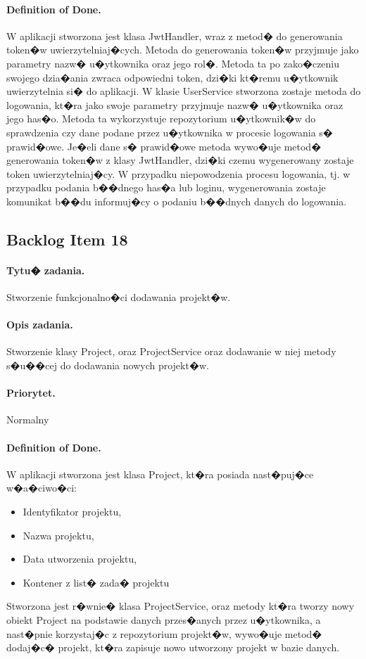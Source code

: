 ﻿\documentclass[a4paper]{article}
\begin{document}
\paragraph{Definition of Done.} W aplikacji stworzona jest klasa JwtHandler, wraz z metod� do generowania token�w uwierzytelniaj�cych. Metoda do generowania token�w przyjmuje jako parametry nazw� u�ytkownika oraz jego rol�. Metoda ta po zako�czeniu swojego dzia�ania zwraca odpowiedni token, dzi�ki kt�remu u�ytkownik uwierzytelnia si� do aplikacji. W klasie UserService stworzona zostaje metoda do logowania, kt�ra jako swoje parametry przyjmuje nazw� u�ytkownika oraz jego has�o. Metoda ta wykorzystuje repozytorium u�ytkownik�w do sprawdzenia czy dane podane przez u�ytkownika w procesie logowania s� prawid�owe. Je�eli dane s� prawid�owe metoda wywo�uje metod� generowania token�w z klasy JwtHandler, dzi�ki czemu wygenerowany zostaje token uwierzytelniaj�cy. W przypadku niepowodzenia procesu logowania, tj. w przypadku podania b��dnego has�a lub loginu, wygenerowania zostaje komunikat b��du informuj�cy o podaniu b��dnych danych do logowania.

\subsection{Backlog Item 18} 
\paragraph{Tytu� zadania.}  Stworzenie funkcjonalno�ci dodawania projekt�w.
\paragraph{Opis zadania.} Stworzenie klasy Project, oraz ProjectService oraz dodawanie w niej metody s�u��cej do dodawania nowych projekt�w. 
\paragraph{Priorytet.} Normalny
\paragraph{Definition of Done.} W aplikacji stworzona jest klasa Project, kt�ra posiada nast�puj�ce w�a�ciwo�ci:
\begin{itemize}
\item Identyfikator projektu, 
\item Nazwa projektu, 
\item Data utworzenia projektu,
\item Kontener z list� zada� projektu
\end{itemize}
Stworzona jest r�wnie� klasa ProjectService, oraz metody kt�ra tworzy nowy obiekt Project na podstawie danych przes�anych przez u�ytkownika, a nast�pnie korzystaj�c z repozytorium projekt�w, wywo�uje metod� dodaj�c� projekt, kt�ra zapisuje nowo utworzony projekt w bazie danych. 
\end{document}
